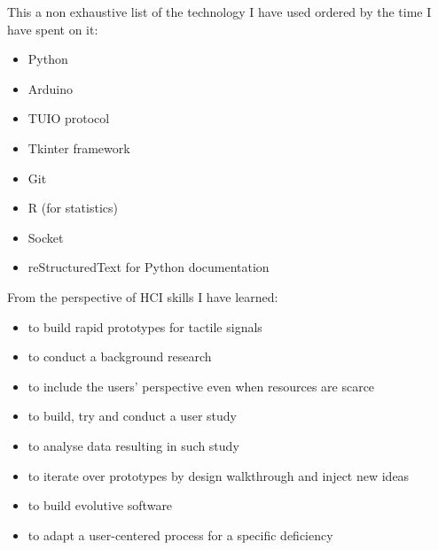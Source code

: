 This a non exhaustive list of the technology I have used ordered by the time I have spent on it:

\begin{itemize}
	\item Python
	\item Arduino
	\item TUIO protocol
	\item Tkinter framework
	\item Git
	\item R (for statistics)
	\item Socket
	\item reStructuredText for Python documentation
\end{itemize}

From the perspective of HCI skills I have learned:

\begin{itemize}
	\item to build rapid prototypes for tactile signals
	\item to conduct a background research
	\item to include the users' perspective even when resources are scarce
	\item to build, try and conduct a user study
	\item to analyse data resulting in such study
	\item to iterate over prototypes by design walkthrough and inject new ideas
	\item to build evolutive software
	\item to adapt a user-centered process for a specific deficiency
\end{itemize}


